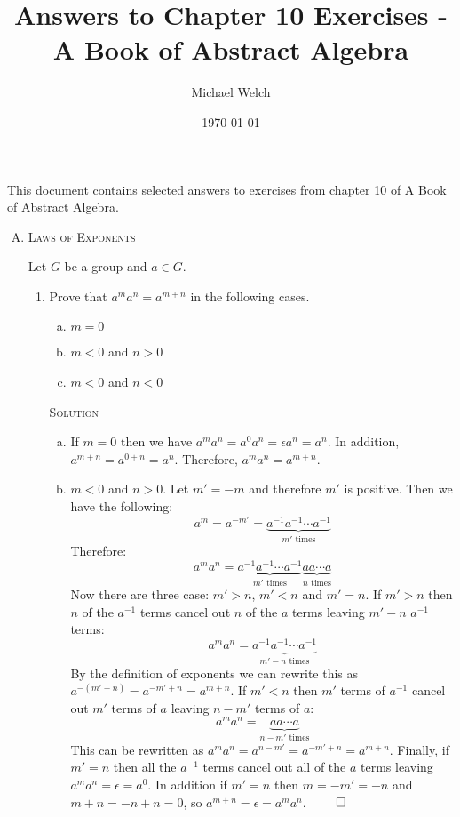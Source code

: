 \documentclass[twoside]{amsart}
\newcommand{\solution}{\textsc{Solution}\xspace}
\newcommand{\blank}{\vspace{5pt}}
\begin{document}
\title{Answers to Chapter 10 Exercises - A Book of Abstract Algebra}
\author{Michael Welch}
\date{\today}
\maketitle

This document contains selected answers to exercises from chapter 10
of A Book of Abstract Algebra.


\begin{enumerate}[A.]
   
   \item \textsc{Laws of Exponents}

   Let $G$ be a group and $a \in G$.

   \begin{enumerate}[1]
      \blank
      \item Prove that $a^m a^n = a^{m+n}$ in the following cases.
      \begin{enumerate}[(a)]
         \item $m=0$
         \item $m<0$ and $n>0$
         \item $m<0$ and $n<0$
      \end{enumerate}

      \blank \noindent \solution
      \begin{enumerate}[(a)]
         \item If $m=0$ then we have $a^m a^n = a^0 a^n = \epsilon a^n = a^n$.
         In addition, $a^{m+n} = a^{0+n} = a^n$. Therefore, $a^m a^n = a^{m+n}$.

         \item $m<0$ and $n>0$. 
         Let $m' = -m$ and therefore $m'$ is positive. Then 
         we have the following:
         \[a^m = a^{-m'} = \underbrace{a^{-1}a^{-1}\cdots 
         a^{-1}}_{m'\text{ times}}\] Therefore: \[a^m a^n =
         \underbrace{a^{-1}a^{-1}\cdots a^{-1}}_{m'\text{ times}}
         \underbrace{aa\cdots a}_{n\text{ times}}\] 
         Now there are three case: $m'>n$, $m'<n$ and $m'=n$.
         If $m' > n$
         then $n$ of the $a^{-1}$ terms cancel out $n$ of the $a$
         terms leaving $m'-n$ $a^{-1}$ terms: \[a^m a^n = \underbrace{
         a^{-1} a^{-1} \cdots a^{-1}}_{m'-n\text{ times}}\] By
         the definition of exponents we can rewrite this as
         $a^{-(m'-n)} = a^{-m'+n} = a^{m+n}$. If
         $m' < n$ then $m'$ terms of $a^{-1}$ cancel out
         $m'$ terms of $a$ leaving $n-m'$ terms of $a$:
         \[a^m a^n = \underbrace{a a \cdots a}_{n-m'\text{ times}}\]
         This can be rewritten as $a^m a^n = a^{n-m'} = a^{-m' + n} 
         = a^{m+n}$. Finally, if $m'=n$ then all the $a^{-1}$ terms
         cancel out all of the $a$ terms leaving $a^m a^n = \epsilon
         = a^0$. In addition if $m'=n$ then $m=-m'=-n$ and
         $m+n=-n+n = 0$, so $a^{m+n} = \epsilon = a^ma^n$. $\qed$


\end{enumerate}
\end{enumerate}
\end{enumerate}
\end{document}
